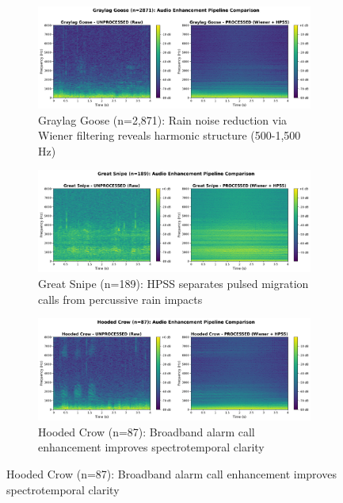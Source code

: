 \documentclass[twocolumn]{article}
\begin{document}
\begin{figure}[p]
\centering
\begin{subfigure}{0.78\textwidth}
\centering
\includegraphics[width=\textwidth]{figures/comparison_graylag_goose.png}
\caption{Graylag Goose (n=2,871): Rain noise reduction via Wiener filtering reveals harmonic structure (500-1,500 Hz)}
\end{subfigure}

\vspace{0.8cm}

\begin{subfigure}{0.78\textwidth}
\centering
\includegraphics[width=\textwidth]{figures/comparison_great_snipe.png}
\caption{Great Snipe (n=189): HPSS separates pulsed migration calls from percussive rain impacts}
\end{subfigure}

\vspace{0.8cm}

\begin{subfigure}{0.78\textwidth}
\centering
\includegraphics[width=\textwidth]{figures/comparison_hooded_crow.png}
\caption{Hooded Crow (n=87): Broadband alarm call enhancement improves spectrotemporal clarity}
\end{subfigure}


\end{figure}
\end{document}

